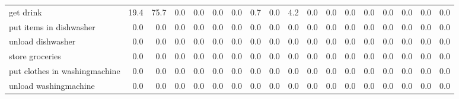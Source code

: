 \documentclass{article}
\begin{document}
\begin{sideways}
\begin{tabular}{lrrrrrrrrrrrrrrrrr}
get drink                     &        19.4 &               75.7 &           0.0 &               0.0 &                0.0 &                0.0 &              0.7 &                      0.0 &                   4.2 &              0.0 &              0.0 &                            0.0 &                      0.0 &                    0.0 &                                  0.0 &                          0.0 &                  0.0 \\
put items in dishwasher       &         0.0 &                0.0 &           0.0 &               0.0 &                0.0 &                0.0 &              0.0 &                      0.0 &                   0.0 &              0.0 &              0.0 &                            0.0 &                      0.0 &                    0.0 &                                  0.0 &                          0.0 &                  0.0 \\
unload dishwasher             &         0.0 &                0.0 &           0.0 &               0.0 &                0.0 &                0.0 &              0.0 &                      0.0 &                   0.0 &              0.0 &              0.0 &                            0.0 &                      0.0 &                    0.0 &                                  0.0 &                          0.0 &                  0.0 \\
store groceries               &         0.0 &                0.0 &           0.0 &               0.0 &                0.0 &                0.0 &              0.0 &                      0.0 &                   0.0 &              0.0 &              0.0 &                            0.0 &                      0.0 &                    0.0 &                                  0.0 &                          0.0 &                  0.0 \\
put clothes in washingmachine &         0.0 &                0.0 &           0.0 &               0.0 &                0.0 &                0.0 &              0.0 &                      0.0 &                   0.0 &              0.0 &              0.0 &                            0.0 &                      0.0 &                    0.0 &                                  0.0 &                          0.0 &                  0.0 \\
unload washingmachine         &         0.0 &                0.0 &           0.0 &               0.0 &                0.0 &                0.0 &              0.0 &                      0.0 &                   0.0 &              0.0 &              0.0 &                            0.0 &                      0.0 &                    0.0 &                                  0.0 &                          0.0 &                  0.0 \\

\end{tabular}
\end{sideways}
\end{document}
